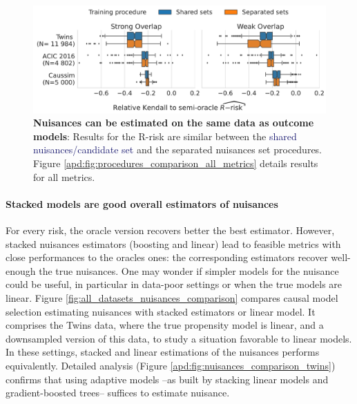 \documentclass[french,12pt,twoside,a4paper]{book}
\begin{document}
\begin{figure}[!tb]
  \centering
  \includegraphics[width=\linewidth]{img/chapter_5/_3_procedure_r_risk_only_3datasets.pdf}
  \caption{\textbf{Nuisances can be estimated on the same data as outcome
      models}: Results for the R-risk are similar between the
    \textcolor{MidnightBlue}{shared
      nuisances/candidate set} and
    the \textcolor{RedOrange}{separated nuisances set} procedures. Figure
    \ref{apd:fig:procedures_comparison_all_metrics} details results for all metrics.}\label{fig:procedures_comparison}
\end{figure}


\paragraph{Stacked models are good overall estimators of nuisances}

For every risk, the oracle version recovers better the best estimator.
However,
stacked nuisances estimators (boosting and linear) lead to feasible
metrics with close performances to the oracles ones: the
corresponding estimators recover well-enough the true nuisances.
One may wonder if simpler models for the nuisance could be useful,
in particular in data-poor settings or when the true models are linear.
Figure \ref{fig:all_datasets_nuisances_comparison} compares causal model
selection estimating nuisances with stacked estimators or linear model.
It comprises the Twins data, where the true propensity model is linear,
and a downsampled version of this data, to study a situation favorable to
linear models. In these settings,
stacked and linear estimations of the nuisances performs equivalently.
Detailed analysis (Figure \ref{apd:fig:nuisances_comparison_twins})
confirms that using adaptive models --as built by
stacking linear models and gradient-boosted trees-- suffices to estimate nuisance.
\end{document}

